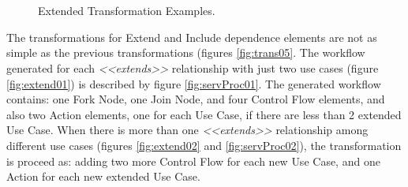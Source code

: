 \begin{figure} [ht!]
\centering

~ %
\\
~ %

\caption{Extended Transformation Examples.}
\label{fig:modelRulesUS2SP}
\end{figure}


The transformations for {\sc Extend} and {\sc Include} dependence elements are
not as simple as the previous transformations (figures \ref{fig:trans05}.
The workflow generated for each \textit{<<extends>>} relationship with just two
use cases (figure \ref{fig:extend01}) is described by figure
\ref{fig:servProc01}. The generated workflow contains: one {\sc Fork Node},
one {\sc Join Node}, and four {\sc Control Flow} elements, and also two {\sc
Action} elements, one for each {\sc Use Case}, if there are less than 2 extended
{\sc Use Case}. When there is more than one  \textit{<<extends>>} relationship
among different use cases (figures \ref{fig:extend02} and
\ref{fig:servProc02}), the transformation is proceed as: adding two more {\sc
Control Flow} for each new {\sc Use Case}, and one {\sc Action} for each new
extended {\sc Use Case}.

